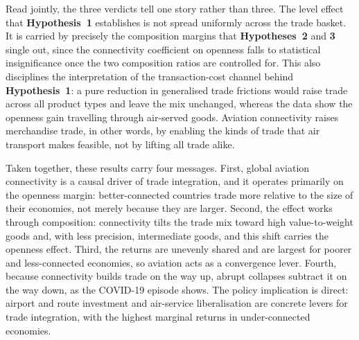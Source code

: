 Read jointly, the three verdicts tell one story rather than three. The level effect that \textbf{Hypothesis~1} establishes is not spread uniformly across the trade basket. It is carried by precisely the composition margins that \textbf{Hypotheses~2} and \textbf{3} single out, since the connectivity coefficient on openness falls to statistical insignificance once the two composition ratios are controlled for. This also disciplines the interpretation of the transaction-cost channel behind \textbf{Hypothesis~1}: a pure reduction in generalised trade frictions would raise trade across all product types and leave the mix unchanged, whereas the data show the openness gain travelling through
air-served goods. Aviation connectivity raises merchandise trade, in other words, by enabling the kinds of trade that air transport makes feasible, not by lifting all trade alike.

Taken together, these results carry four messages. First, global aviation connectivity is a causal driver of trade integration, and it operates primarily on the openness margin: better-connected countries trade more relative to the size of their economies, not merely because they are larger. Second, the effect works through composition: connectivity tilts the trade mix toward high value-to-weight goods and, with less precision, intermediate goods, and this shift carries the openness effect. Third, the returns are unevenly shared and are largest for poorer and less-connected economies, so aviation acts as a convergence lever. Fourth, because connectivity builds trade on the way up, abrupt collapses subtract it on the way down, as the COVID-19 episode shows. The policy implication is direct: airport and route investment and air-service liberalisation are concrete levers for trade integration, with the highest marginal returns in under-connected economies.

